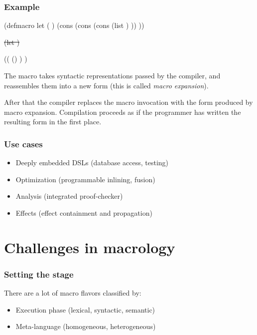 \documentclass[hyperref={bookmarks=false}]{beamer}
\begin{document}
\begin{frame}[fragile]
\frametitle{Example} %

\begin{lstlistinglike}
\begin{semiverbatim}
(defmacro let (\text{\color{red}{decl}} \text{\color{violet}{body}})
  (cons
   (cons \text{\color{blue}{'lambda}}
         (cons (list \text{\color{red}{(car decl)}}) \text{\color{violet}{body}}))
   \text{\color{red}{(cdr decl)}}))

\sout{(let \text{\color{red}{(x 42)}} \text{\color{violet}{(print x)}})}

((\text{\color{blue}{lambda}} (\text{\color{red}{x}}) \text{\color{violet}{(print x)}}) \text{\color{red}{42}})
\end{semiverbatim}
\end{lstlistinglike}

The macro takes syntactic representations passed by the compiler,
and reassembles them into a new form (this is called \emph{macro expansion}).

After that the compiler replaces the macro invocation with the form
produced by macro expansion. Compilation proceeds as if the programmer
has written the resulting form in the first place.
\end{frame}

\begin{frame}[fragile]
\frametitle{Use cases}

\begin{itemize}
\item Deeply embedded DSLs (database access, testing)
\item Optimization (programmable inlining, fusion)
\item Analysis (integrated proof-checker)
\item Effects (effect containment and propagation)
\end{itemize}

\vskip15pt


\end{frame}

\section{Challenges in macrology}

\begin{frame}[fragile]
\frametitle{Setting the stage}

There are a lot of macro flavors classified by:
\begin{itemize}
\item Execution phase (lexical, syntactic, semantic)
\item Meta-language (homogeneous, heterogeneous)
\end{itemize}

\end{frame}
\end{document}
